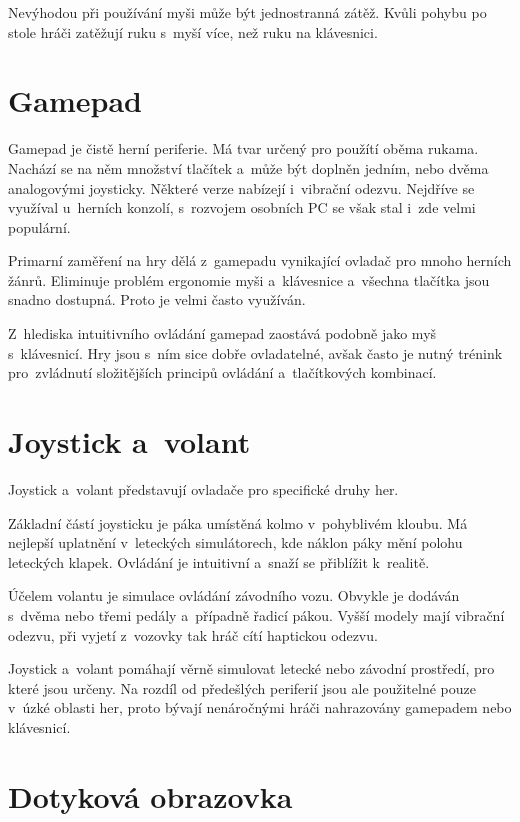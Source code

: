 \documentclass[thesis=B,czech,hidelinks]{FITthesis}[2012/06/26] %
\begin{document}
Nevýhodou při používání myši může být jednostranná zátěž. Kvůli pohybu po stole hráči zatěžují ruku s~myší více, než ruku na klávesnici.

\section{Gamepad}

Gamepad je čistě herní periferie. Má tvar určený pro použítí oběma rukama. Nachází se na něm množství tlačítek a~může být doplněn jedním, nebo dvěma analogovými joysticky. Některé verze nabízejí i~vibrační odezvu. Nejdříve se využíval u~herních konzolí, s~rozvojem osobních PC se však stal i~zde velmi populární.

Primarní zaměření na hry dělá z~gamepadu vynikající ovladač pro mnoho herních žánrů. Eliminuje problém ergonomie myši a~klávesnice a~všechna tlačítka jsou snadno dostupná. Proto je velmi často využíván.

Z~hlediska intuitivního ovládání gamepad zaostává podobně jako myš s~klávesnicí. Hry jsou s~ním sice dobře ovladatelné, avšak často je nutný trénink pro~zvládnutí složitějších principů ovládání a~tlačítkových kombinací.

\section{Joystick a~volant}

Joystick a~volant představují ovladače pro specifické druhy her.

Základní částí joysticku je páka umístěná kolmo v~pohyblivém kloubu. Má nejlepší uplatnění v~leteckých simulátorech, kde náklon páky mění polohu leteckých klapek. Ovládání je intuitivní a~snaží se přiblížit k~realitě.

Účelem volantu je simulace ovládání závodního vozu. Obvykle je dodáván s~dvěma nebo třemi pedály a~případně řadicí pákou. Vyšší modely mají vibrační odezvu, při vyjetí z~vozovky tak hráč cítí haptickou odezvu.

Joystick a~volant pomáhají věrně simulovat letecké nebo závodní prostředí, pro které jsou určeny. Na rozdíl od předešlých periferií jsou ale použitelné pouze v~úzké oblasti her, proto bývají nenáročnými hráči nahrazovány gamepadem nebo klávesnicí.

\section{Dotyková obrazovka}
\end{document}
